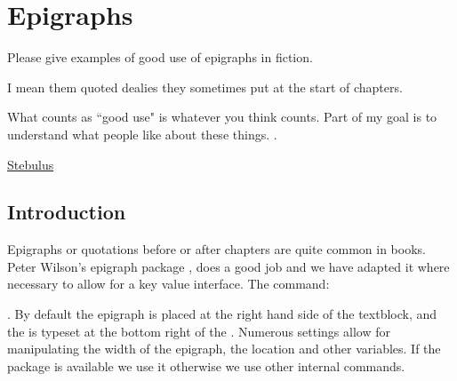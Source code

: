 \makeatletter\@specialfalse
{}



\chapter{Epigraphs}
\label{c:epigraphs}

\epigraph{Please give examples of good use of epigraphs in fiction.

I mean them quoted dealies they sometimes put at the start of chapters.

What counts as ``good use" is whatever you think counts. Part of my goal is to understand what people like about these things.
.}{\href{http://ask.metafilter.com/207423/Good-use-of-epigraphs-in-fiction}{Stebulus}}



\section{Introduction}

Epigraphs or quotations before or after chapters are quite common in books. Peter Wilson's epigraph package \citep{epigraph}, 
does a good job and we have adapted it where necessary to allow for a key value interface. The command:

. By default the epigraph is placed at the right
hand side of the textblock, and the  is typeset at the bottom right of the . 
Numerous settings allow for manipulating the width of the epigraph, the location and other 
variables. If the package is available we use it otherwise we use other internal commands.

